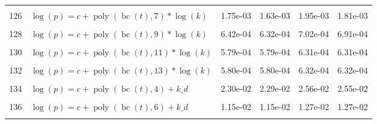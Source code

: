 \documentclass[12pt,a4paper]{article}
\DeclareMathOperator{\bc}{bc}
\DeclareMathOperator{\poly}{poly}
\begin{document}
\begin{longtable}[t]{ll>{\raggedleft\arraybackslash}p{2cm}>{\raggedleft\arraybackslash}p{2cm}>{\raggedleft\arraybackslash}p{2cm}>{\raggedleft\arraybackslash}p{2cm}}
\cellcolor{gray!6}{125} & \cellcolor{gray!6}{$\log(p) = c + \poly\left( \bc(t), 6 \right) * \log(k)$} & \cellcolor{gray!6}{8.47e-04} & \cellcolor{gray!6}{7.92e-04} & \cellcolor{gray!6}{9.34e-04} & \cellcolor{gray!6}{8.72e-04}\\
126 & $\log(p) = c + \poly\left( \bc(t), 7 \right) * \log(k)$ & 1.75e-03 & 1.63e-03 & 1.95e-03 & 1.81e-03\\
\cellcolor{gray!6}{127} & \cellcolor{gray!6}{$\log(p) = c + \poly\left( \bc(t), 8 \right) * \log(k)$} & \cellcolor{gray!6}{1.17e-03} & \cellcolor{gray!6}{9.43e-04} & \cellcolor{gray!6}{1.30e-03} & \cellcolor{gray!6}{1.04e-03}\\
128 & $\log(p) = c + \poly\left( \bc(t), 9 \right) * \log(k)$ & 6.42e-04 & 6.32e-04 & 7.02e-04 & 6.91e-04\\
\cellcolor{gray!6}{129} & \cellcolor{gray!6}{$\log(p) = c + \poly\left( \bc(t), 10 \right) * \log(k)$} & \cellcolor{gray!6}{5.81e-04} & \cellcolor{gray!6}{5.81e-04} & \cellcolor{gray!6}{6.33e-04} & \cellcolor{gray!6}{6.33e-04}\\
130 & $\log(p) = c + \poly\left( \bc(t), 11 \right) * \log(k)$ & 5.79e-04 & 5.79e-04 & 6.31e-04 & 6.31e-04\\
\cellcolor{gray!6}{131} & \cellcolor{gray!6}{$\log(p) = c + \poly\left( \bc(t), 12 \right) * \log(k)$} & \cellcolor{gray!6}{5.79e-04} & \cellcolor{gray!6}{5.79e-04} & \cellcolor{gray!6}{6.31e-04} & \cellcolor{gray!6}{6.31e-04}\\
132 & $\log(p) = c + \poly\left( \bc(t), 13 \right) * \log(k)$ & 5.80e-04 & 5.80e-04 & 6.32e-04 & 6.32e-04\\
\cellcolor{gray!6}{133} & \cellcolor{gray!6}{$\log(p) = c + \poly\left( \bc(t), 3 \right) + k\_d$} & \cellcolor{gray!6}{3.67e-02} & \cellcolor{gray!6}{1.98e-02} & \cellcolor{gray!6}{4.09e-02} & \cellcolor{gray!6}{2.19e-02}\\
134 & $\log(p) = c + \poly\left( \bc(t), 4 \right) + k\_d$ & 2.30e-02 & 2.29e-02 & 2.56e-02 & 2.55e-02\\
\cellcolor{gray!6}{135} & \cellcolor{gray!6}{$\log(p) = c + \poly\left( \bc(t), 5 \right) + k\_d$} & \cellcolor{gray!6}{1.47e-02} & \cellcolor{gray!6}{1.28e-02} & \cellcolor{gray!6}{1.64e-02} & \cellcolor{gray!6}{1.41e-02}\\
136 & $\log(p) = c + \poly\left( \bc(t), 6 \right) + k\_d$ & 1.15e-02 & 1.15e-02 & 1.27e-02 & 1.27e-02\\
\cellcolor{gray!6}{137} & \cellcolor{gray!6}{$\log(p) = c + \poly\left( \bc(t), 7 \right) + k\_d$} & \cellcolor{gray!6}{1.17e-02} & \cellcolor{gray!6}{1.16e-02} & \cellcolor{gray!6}{1.29e-02} & \cellcolor{gray!6}{1.29e-02}\\

\end{longtable}
\end{document}
